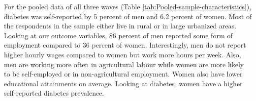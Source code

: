 For the pooled data of all three waves (Table \ref{tab:Pooled-sample-characteristics}),
diabetes was self-reported by 5 percent of men and 6.2 percent of
women. Most of the respondents in the sample either live in rural
or in large urbanized areas. Looking at our outcome variables, 86
percent of men reported some form of employment compared to 36 percent
of women. Interestingly, men do not report higher hourly wages compared
to women but work more hours per week. Also, men are working more
often in agricultural labour while women are more likely to be self-employed
or in non-agricultural employment. Women also have lower educational
attainments on average. Looking at diabetes, women have a higher self-reported
diabetes prevalence. 
\begin{table}[h]
\begin{center}
\begin{adjustbox}{max width=\textwidth}


\end{adjustbox}
\end{center}
\end{table}
